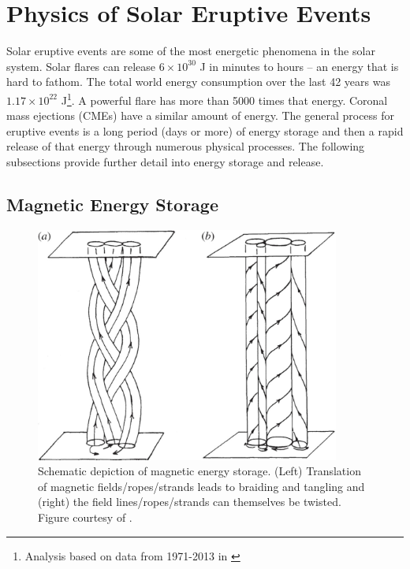 \section{Physics of Solar Eruptive Events}
\label{sec:physicssolareruptiveevents}
Solar eruptive events are some of the most energetic phenomena in the solar system. Solar flares can release $6 \times 10^{30}$ J in minutes to hours -- an energy that is hard to fathom. The total world energy consumption over the last 42 years was $1.17 \times 10^{22}$ J\footnote{Analysis based on data from 1971-2013 in \citet{iea2015}}. A powerful flare has more than 5000 times that energy. Coronal mass ejections (CMEs) have a similar amount of energy. The general process for eruptive events is a long period (days or more) of energy storage and then a rapid release of that energy through numerous physical processes. The following subsections provide further detail into energy storage and release.

\subsection{Magnetic Energy Storage}

\begin{figure}[!h]
    \begin{center}
	    \includegraphics[width=100mm]{Images/MagneticEnergyStorage.png}
    \end{center}
    \caption[Magnetic energy storage diagram]{
        Schematic depiction of magnetic energy storage. (Left) Translation of magnetic fields/ropes/strands leads to 
        braiding and tangling and (right) the field lines/ropes/strands can themselves be twisted. Figure courtesy of 
        \citet{Klimchuk2015}. 
    }
    \label{fig:magneticenergystorage}
\end{figure}

